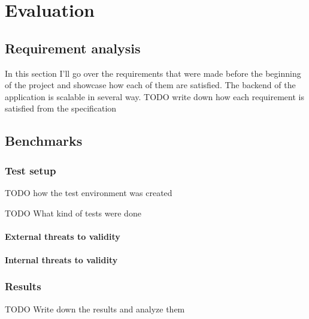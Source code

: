 \chapter{Evaluation}

	\section{Requirement analysis}
	In this section I'll go over the requirements that were made before the beginning of the project and showcase how each of them are satisfied.
	The backend of the application is scalable in several way. 
	TODO write down how each requirement is satisfied from the specification

	\section{Benchmarks}

	\subsection{Test setup}
	TODO how the test environment was created

	TODO What kind of tests were done

		\subsubsection{External threats to validity}

		\subsubsection{Internal threats to validity}
	

	\subsection{Results}
	TODO Write down the results and analyze them